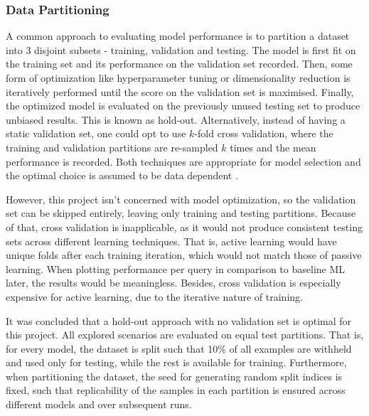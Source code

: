 \documentclass[a4paper,12pt]{article}
\begin{document}
\subsubsection{Data Partitioning}
\label{section:partitioning}
A common approach to evaluating model performance is to partition a dataset into 3 disjoint subsets - training, validation and testing. The model is first fit on the training set and its performance on the validation set recorded. Then, some form of optimization like hyperparameter tuning or dimensionality reduction is iteratively performed until the score on the validation set is maximised. Finally, the optimized model is evaluated on the previously unused testing set to produce unbiased results. This is known as hold-out. Alternatively, instead of having a static validation set, one could opt to use $k$-fold cross validation, where the training and validation partitions are re-sampled $k$ times and the mean performance is recorded. Both techniques are appropriate for model selection and the optimal choice is assumed to be data dependent \cite{Xu2018}.

\label{section:partitioning-optimisation}
However, this project isn't concerned with model optimization, so the validation set can be skipped entirely, leaving only training and testing partitions. Because of that, cross validation is inapplicable, as it would not produce consistent testing sets across different learning techniques. That is, active learning would have unique folds after each training iteration, which would not match those of passive learning. When plotting performance per query in comparison to baseline ML later, the results would be meaningless. Besides, cross validation is especially expensive for active learning, due to the iterative nature of training.

It was concluded that a hold-out approach with no validation set is optimal for this project. All explored scenarios are evaluated on equal test partitions. That is, for every model, the dataset is split such that 10\% of all examples are withheld and used only for testing, while the rest is available for training. Furthermore, when partitioning the dataset, the seed for generating random split indices is fixed, such that replicability of the samples in each partition is ensured across different models and over subsequent runs.
\end{document}
